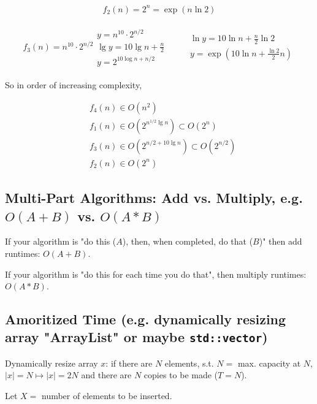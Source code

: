 \documentclass[10pt]{amsart}
\begin{document}
\[
\begin{gathered}
f_2(n) = 2^n = \exp{(n\ln{2})}
\end{gathered}
\]

\[
\begin{gathered}
f_3(n) = n^{10} \cdot 2^{n/2}
\begin{gathered}
y = n^{10} \cdot 2^{n/2} \\
\lg{y} = 10 \lg{n} + \frac{n}{2} \\
y = 2^{10 \log{n} + n/2}
\end{gathered}
\quad \quad \, \begin{gathered}
\ln{y} = 10 \ln{n} + \frac{n}{2} \ln{2} \\
y = \exp{(10 \ln{n} + \frac{ \ln{2}}{2} n )}
\end{gathered}
\end{gathered}
\]

So in order of increasing complexity,

\[
\boxed{
	\begin{aligned}
	& f_4(n) \in O(n^2) \\
	& f_1(n) \in O(2^{n^{1/2} \lg{n}}) \subset O(2^n) \\
	& f_3(n) \in O(2^{n/2 + 10 \lg{n}}) \subset O(2^{n/2}) \\
	& f_2(n) \in O(2^n)
	\end{aligned}
}
\]

\subsection{Multi-Part Algorithms: Add vs. Multiply, e.g. $O(A + B)$ vs. $O(A*B)$}

If your algorithm is "do this ($A$), then, when completed, do that ($B$)" then add runtimes: $O(A+B)$.

If your algorithm is "do this for each time you do that", then multiply runtimes: $O(A*B)$.

\subsection{Amoritized Time (e.g. dynamically resizing array "ArrayList" or maybe \texttt{std::vector})}

Dynamically resize array $x$: if there are $N$ elements, s.t. $N= $ max. capacity at $N$, $|x| = N \mapsto |x| = 2N$ and there are $N$ copies to be made ($T=N$). 

Let $X = $ number of elements to be inserted. 
\end{document}
